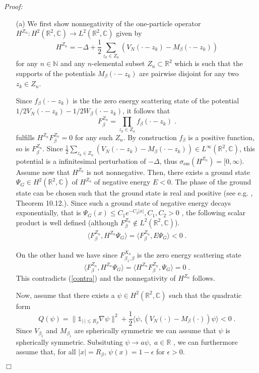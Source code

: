 \documentclass[11pt, english, american]{article}
\newenvironment{proof}{\emph{Proof:}}{\begin{flushright} $ \Box $ \end{flushright}}
\begin{document}
\begin{proof}
\begin{itemize}
\item[(a)]
We first show nonnegativity of the one-particle operator 
$H^{Z_n} : H^2 (\mathbb{R}^2, \mathbb{C}) \rightarrow L^ 2( \mathbb{R}^2, \mathbb{C})$  given by
$$H^{Z_n}=-\Delta+ \frac{1}{2} \sum_{z_k\in Z_n} (V_{N}(\cdot-z_k)-M_{\beta}(\cdot-z_k))$$
for any $n\in \mathbb{N}$ and any $n$-elemental subset $Z_n\subset\mathbb{R}^2$ which is
 such that the supports of the potentials
$M_{\beta}(\cdot-z_k)$ are pairwise disjoint for any two $z_k\in
Z_n$.


Since $f_{\beta}(\cdot-z_k)$ is the the zero energy scattering state of the potential
$1/2 V_{N}(\cdot-z_k)- 1/2 W_{\beta}(\cdot-z_k)$, it follows that
$$F^{Z_n}_{\beta}=\prod_{z_k\in Z_n}f_{\beta}(\cdot-z_k)\;.$$ fulfills
$H^{Z_n}  F^{Z_n}_{\beta}=0$
for any such $Z_n$.
By construction $f_{\beta}$ is a positive function, so is $F^{Z_n}_{\beta}$.
Since $\frac{1}{2} \sum_{z_k\in Z_n} (V_{N}(\cdot-z_k)-M_{\beta}(\cdot-z_k)) \in L^\infty (\mathbb{R}^2,\mathbb{C})$, this potential is a infinitesimal perturbation of $-\Delta$, thus 
$\sigma_{\text{ess}}( H^{Z_n} ) =[0, \infty )$. 
Assume now that $H^{Z_n}$ is not nonnegative. Then, there exists a ground state $\Psi_G\in H^2( \mathbb{R}^2,\mathbb{C})$ of $H^{Z_n}$ of
negative energy $E<0$. The phase of the ground state can be chosen such that  the ground state is real and positive (see e.g. \cite{teschl}, Theorem 10.12.).
 Since such a ground state of negative energy decays exponentially, that is
$\Psi_G (x) \leq C_1 e^{-C_2 |x|}, C_1,C_2 >0$ , 
the following scalar product is well defined (although $F^{Z_n}_{\beta} \notin  L^2( \mathbb{R}^2, \mathbb{C})$).
\begin{align}
\label{contra}\langle F^{Z_n}_{\beta},H^{Z_n}\Psi_G\rangle=\langle F^{Z_n}_{\beta},E\Psi_G\rangle<0
\;.
\end{align}


On the other hand we have since $F^{X_n}_{\beta_1,\beta}$ is the zero energy scattering state 
$$\langle
F^{Z_n}_{\beta},H^{Z_n}\Psi_G\rangle=\langle H^{Z_n}F^{Z_n}_{\beta},\Psi_G\rangle=0\;.$$
This contradicts (\ref{contra}) and the nonnegativity of $H^{Z_n}$ follows.

Now, assume that there exists a $\psi\in H^2 (\mathbb{R}^2,\mathbb{C}) $ such that the quadratic form
$$
Q (\psi)=
\|\mathds{1}_{|\cdot|\leq  R_{\beta}}\nabla\psi\|^2+
\frac{1}{2}\langle\psi,(V_{N}(\cdot)-M_{\beta}(\cdot))\psi\rangle<0\;.$$ 
Since $V_{\beta_1}$ and $M_{\beta_1}$ are spherically symmetric we can assume that $\psi$ is spherically symmetric. Subsituting $ \psi \rightarrow a \psi ,\; a \in \mathbb{R}$ , we can furthermore assume that, for all $|x| = R_\beta$, $\psi(x) =
1- \epsilon$ for $\epsilon>0$.


\end{itemize}
\end{proof}
\end{document}
